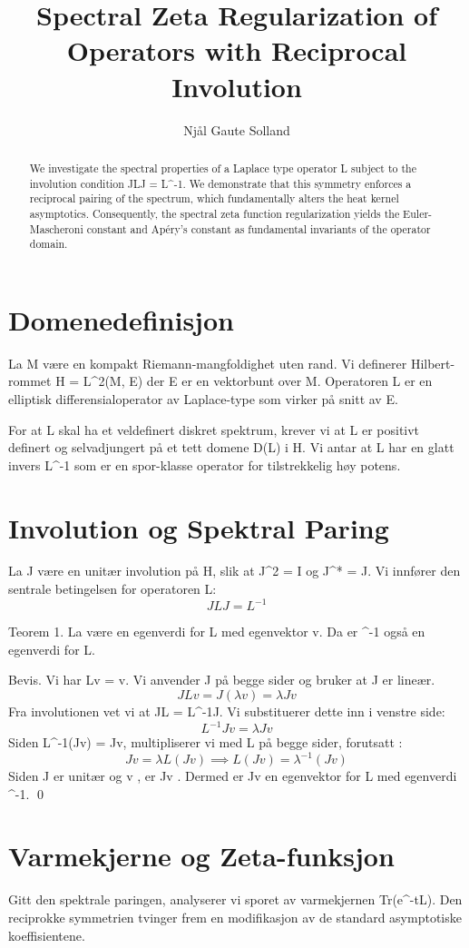 \documentclass[12pt]{article}
\title{Spectral Zeta Regularization of Operators with Reciprocal Involution}
\author{Njål Gaute Solland}
\date{}
\begin{document}
\maketitle

\begin{abstract}
We investigate the spectral properties of a Laplace type operator L subject to the involution condition JLJ = L^{-1}. We demonstrate that this symmetry enforces a reciprocal pairing of the spectrum, which fundamentally alters the heat kernel asymptotics. Consequently, the spectral zeta function regularization yields the Euler-Mascheroni constant and Apéry's constant as fundamental invariants of the operator domain.
\end{abstract}

\section{Domenedefinisjon}
La M være en kompakt Riemann-mangfoldighet uten rand. Vi definerer Hilbert-rommet H = L^2(M, E) der E er en vektorbunt over M. Operatoren L er en elliptisk differensialoperator av Laplace-type som virker på snitt av E.

For at L skal ha et veldefinert diskret spektrum, krever vi at L er positivt definert og selvadjungert på et tett domene D(L) i H. Vi antar at L har en glatt invers L^{-1} som er en spor-klasse operator for tilstrekkelig høy potens.

\section{Involution og Spektral Paring}
La J være en unitær involution på H, slik at J^2 = I og J^* = J. Vi innfører den sentrale betingelsen for operatoren L:
\[ JLJ = L^{-1} \]

Teorem 1. La \lambda være en egenverdi for L med egenvektor v. Da er \lambda^{-1} også en egenverdi for L.

Bevis. Vi har Lv = \lambda v. Vi anvender J på begge sider og bruker at J er lineær.
\[ JLv = J(\lambda v) = \lambda Jv \]
Fra involutionen vet vi at JL = L^{-1}J. Vi substituerer dette inn i venstre side:
\[ L^{-1}Jv = \lambda Jv \]
Siden L^{-1}(Jv) = \lambda Jv, multipliserer vi med L på begge sider, forutsatt \lambda {}:
\[ Jv = \lambda L(Jv) \implies L(Jv) = \lambda^{-1} (Jv) \]
Siden J er unitær og v , er Jv . Dermed er Jv en egenvektor for L med egenverdi \lambda^{-1}. \qed

\section{Varmekjerne og Zeta-funksjon}
Gitt den spektrale paringen, analyserer vi sporet av varmekjernen Tr(e^{-tL}). Den reciprokke symmetrien tvinger frem en modifikasjon av de standard asymptotiske koeffisientene.
\end{document}
